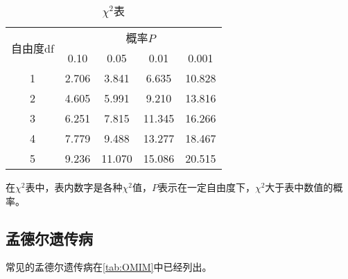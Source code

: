 \begin{table}[h!]
	\centering
	\begin{tabular}{|c|c|c|c|c|}
		\hline
		\multirow{2}{*}{自由度df} & \multicolumn{4}{c|}{概率$P$} \\ \cline{2-5}
		& 0.10   & 0.05   & 0.01   & 0.001  \\ \hline
		1                                        & 2.706 & 3.841 & 6.635 & 10.828 \\ \hline
		2                                        & 4.605 & 5.991 & 9.210 & 13.816 \\ \hline
		3                                        & 6.251 & 7.815 & 11.345& 16.266 \\ \hline
		4                                        & 7.779 & 9.488 & 13.277& 18.467 \\ \hline
		5                                        & 9.236 & 11.070& 15.086& 20.515 \\ \hline
	\end{tabular}
	\caption{$\chi^{2}$表}
	\label{tab:chisq_table}
\end{table}

在$\chi^{2}$表中，表内数字是各种$\chi^{2}$值，$P$表示在一定自由度下，$\chi^{2}$大于表中数值的概率。


\subsection{孟德尔遗传病}

常见的孟德尔遗传病在\autoref{tab:OMIM}中已经列出。

